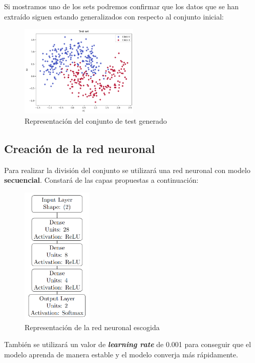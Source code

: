 \documentclass[paper=a4, fontsize=11pt]{scrartcl} %
\numberwithin{equation}{section} %
\numberwithin{figure}{section} %
\numberwithin{table}{section} %
\begin{document}
Si mostramos uno de los sets podremos confirmar que los datos que se han extraído siguen estando generalizados con respecto al conjunto inicial:

\begin{figure}[H]
\caption{Representación del conjunto de test generado}
\centering
\includegraphics[width=0.5\textwidth]{images/test_output.png}
\end{figure}

\subsection{Creación de la red neuronal}

Para realizar la división del conjunto se utilizará una red neuronal con modelo \textbf{secuencial}. Constará de las capas propuestas a continuación:

\begin{figure}[H]
\caption{Representación de la red neuronal escogida}
\centering
\includegraphics[width=0.3\textwidth]{images/graph.png}
\end{figure}

También se utilizará un valor de \textbf{\textit{learning rate}} de 0.001 para conseguir que el modelo aprenda de manera estable y el modelo converja más rápidamente.
\end{document}
